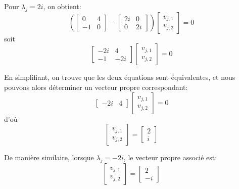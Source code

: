                 Pour $\lambda_j=2i$, on obtient:
                \begin{equation}
                    \left( \begin{bmatrix} 0 & 4 \\ -1 & 0 \end{bmatrix} - \begin{bmatrix} 2i & 0 \\ 0 & 2i \end{bmatrix} \right) \begin{bmatrix} v_{j,1} \\ v_{j,2} \end{bmatrix}=0
                \end{equation}
                soit
                \begin{equation}
                    \begin{bmatrix} -2i & 4 \\ -1 & -2i \end{bmatrix} \begin{bmatrix} v_{j,1} \\ v_{j,2} \end{bmatrix}=0
                \end{equation}
                
                En simplifiant, on trouve que les deux équations sont équivalentes, et nous pouvons alors déterminer un vecteur propre correspondant:
                \begin{equation}
                    \begin{bmatrix} -2i & 4 \end{bmatrix} \begin{bmatrix} v_{j,1} \\ v_{j,2} \end{bmatrix}=0
                \end{equation}
                d'où
                \begin{equation}
                    \begin{bmatrix} v_{j,1} \\ v_{j,2} \end{bmatrix}=\begin{bmatrix} 2 \\ i \end{bmatrix}
                \end{equation}
                
                De manière similaire, lorsque $\lambda_j=-2i$, le vecteur propre associé est:
                \begin{equation}
                    \begin{bmatrix} v_{j,1} \\ v_{j,2} \end{bmatrix}=\begin{bmatrix} 2 \\ -i \end{bmatrix}
                \end{equation}
                
